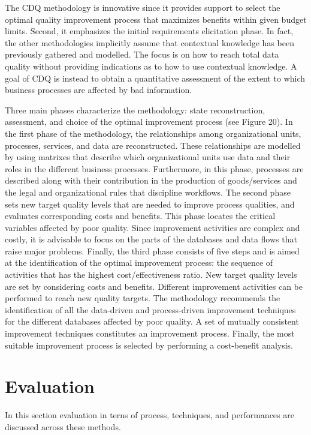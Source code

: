 \documentclass[pdftex,english,oribibl]{llncs}
\begin{document}
The CDQ methodology is innovative since it provides support to select the optimal quality improvement process that maximizes benefits within given budget limits.
Second, it emphasizes the initial requirements elicitation phase. In fact, the other methodologies implicitly assume that contextual knowledge has been previously gathered and modelled.
The focus is on how to reach total data quality without providing indications as to how to use contextual knowledge.
A goal of CDQ is instead to obtain a quantitative assessment of the extent to which business processes are affected by bad information.

Three main phases characterize the methodology: state reconstruction, assessment, and choice of the optimal improvement process (see Figure 20).
In the first phase of the methodology, the relationships among organizational units, processes, services, and data are reconstructed.
These relationships are modelled by using matrixes that describe which organizational units use data and their roles in the different business processes.
Furthermore, in this phase, processes are described along with their contribution in the production of goods/services and the legal and organizational rules that discipline workflows.
The second phase sets new target quality levels that are needed to improve process qualities, and evaluates corresponding costs and benefits.
This phase locates the critical variables affected by poor quality. Since improvement activities are complex and costly, it is advisable to focus on the parts of the databases and data flows that raise major problems.
Finally, the third phase consists of five steps and is aimed at the identification of the optimal improvement process: the sequence of activities that has the highest cost/effectiveness ratio.
New target quality levels are set by considering costs and benefits. Different improvement activities can be performed to reach new quality targets.
The methodology recommends the identification of all the data-driven and process-driven improvement techniques for the different databases affected by poor quality.
A set of mutually consistent improvement techniques constitutes an improvement process.
Finally, the most suitable improvement process is selected by performing a cost-benefit analysis.

\section{Evaluation}
In this section evaluation in terns of process, techniques, and performances are discussed across these methods.
\end{document}
